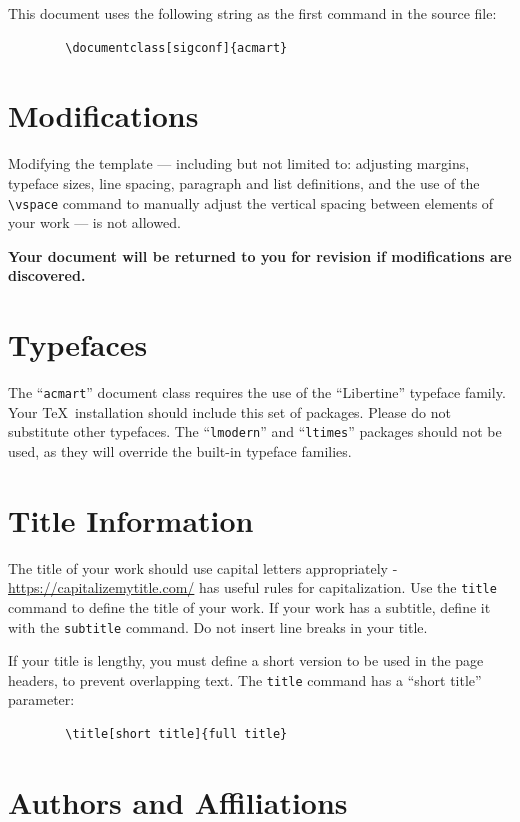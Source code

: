 \documentclass[sigconf]{acmart}
\begin{document}
	This document uses the following string as the first command in the
	source file:
	\begin{verbatim}
		\documentclass[sigconf]{acmart}
	\end{verbatim}
	
	\section{Modifications}
	
	Modifying the template --- including but not limited to: adjusting
	margins, typeface sizes, line spacing, paragraph and list definitions,
	and the use of the \verb|\vspace| command to manually adjust the
	vertical spacing between elements of your work --- is not allowed.
	
	{\bfseries Your document will be returned to you for revision if
		modifications are discovered.}
	
	\section{Typefaces}
	
	The ``\verb|acmart|'' document class requires the use of the
	``Libertine'' typeface family. Your \TeX\ installation should include
	this set of packages. Please do not substitute other typefaces. The
	``\verb|lmodern|'' and ``\verb|ltimes|'' packages should not be used,
	as they will override the built-in typeface families.
	
	\section{Title Information}
	
	The title of your work should use capital letters appropriately -
	\url{https://capitalizemytitle.com/} has useful rules for
	capitalization. Use the {\verb|title|} command to define the title of
	your work. If your work has a subtitle, define it with the
	{\verb|subtitle|} command.  Do not insert line breaks in your title.
	
	If your title is lengthy, you must define a short version to be used
	in the page headers, to prevent overlapping text. The \verb|title|
	command has a ``short title'' parameter:
	\begin{verbatim}
		\title[short title]{full title}
	\end{verbatim}
	
	\section{Authors and Affiliations}
	
\end{document}
